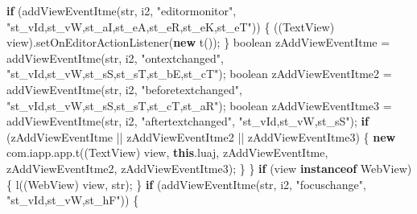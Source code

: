 \documentclass[
]{article}
\newenvironment{Shaded}{}{}
\newcommand{\ControlFlowTok}[1]{\textcolor[rgb]{0.00,0.44,0.13}{\textbf{#1}}}
\newcommand{\DataTypeTok}[1]{\textcolor[rgb]{0.56,0.13,0.00}{#1}}
\newcommand{\FunctionTok}[1]{\textcolor[rgb]{0.02,0.16,0.49}{#1}}
\newcommand{\KeywordTok}[1]{\textcolor[rgb]{0.00,0.44,0.13}{\textbf{#1}}}
\newcommand{\NormalTok}[1]{#1}
\newcommand{\OperatorTok}[1]{\textcolor[rgb]{0.40,0.40,0.40}{#1}}
\newcommand{\StringTok}[1]{\textcolor[rgb]{0.25,0.44,0.63}{#1}}
\begin{document}
\begin{Shaded}
\begin{Highlighting}[]
            \ControlFlowTok{if} \OperatorTok{(}\FunctionTok{addViewEventItme}\OperatorTok{(}\NormalTok{str}\OperatorTok{,}\NormalTok{ i2}\OperatorTok{,} \StringTok{"editormonitor"}\OperatorTok{,} \StringTok{"st\_vId,st\_vW,st\_aI,st\_eA,st\_eR,st\_eK,st\_eT"}\OperatorTok{))} \OperatorTok{\{}
                \OperatorTok{((}\NormalTok{TextView}\OperatorTok{)}\NormalTok{ view}\OperatorTok{).}\FunctionTok{setOnEditorActionListener}\OperatorTok{(}\KeywordTok{new} \FunctionTok{t}\OperatorTok{());}
            \OperatorTok{\}}
            \DataTypeTok{boolean}\NormalTok{ zAddViewEventItme }\OperatorTok{=} \FunctionTok{addViewEventItme}\OperatorTok{(}\NormalTok{str}\OperatorTok{,}\NormalTok{ i2}\OperatorTok{,} \StringTok{"ontextchanged"}\OperatorTok{,} \StringTok{"st\_vId,st\_vW,st\_sS,st\_sT,st\_bE,st\_cT"}\OperatorTok{);}
            \DataTypeTok{boolean}\NormalTok{ zAddViewEventItme2 }\OperatorTok{=} \FunctionTok{addViewEventItme}\OperatorTok{(}\NormalTok{str}\OperatorTok{,}\NormalTok{ i2}\OperatorTok{,} \StringTok{"beforetextchanged"}\OperatorTok{,} \StringTok{"st\_vId,st\_vW,st\_sS,st\_sT,st\_cT,st\_aR"}\OperatorTok{);}
            \DataTypeTok{boolean}\NormalTok{ zAddViewEventItme3 }\OperatorTok{=} \FunctionTok{addViewEventItme}\OperatorTok{(}\NormalTok{str}\OperatorTok{,}\NormalTok{ i2}\OperatorTok{,} \StringTok{"aftertextchanged"}\OperatorTok{,} \StringTok{"st\_vId,st\_vW,st\_sS"}\OperatorTok{);}
            \ControlFlowTok{if} \OperatorTok{(}\NormalTok{zAddViewEventItme }\OperatorTok{||}\NormalTok{ zAddViewEventItme2 }\OperatorTok{||}\NormalTok{ zAddViewEventItme3}\OperatorTok{)} \OperatorTok{\{}
                \KeywordTok{new}\NormalTok{ com}\OperatorTok{.}\FunctionTok{iapp}\OperatorTok{.}\FunctionTok{app}\OperatorTok{.}\FunctionTok{t}\OperatorTok{((}\NormalTok{TextView}\OperatorTok{)}\NormalTok{ view}\OperatorTok{,} \KeywordTok{this}\OperatorTok{.}\FunctionTok{luaj}\OperatorTok{,}\NormalTok{ zAddViewEventItme}\OperatorTok{,}\NormalTok{ zAddViewEventItme2}\OperatorTok{,}\NormalTok{ zAddViewEventItme3}\OperatorTok{);}
            \OperatorTok{\}}
        \OperatorTok{\}}
        \ControlFlowTok{if} \OperatorTok{(}\NormalTok{view }\KeywordTok{instanceof}\NormalTok{ WebView}\OperatorTok{)} \OperatorTok{\{}
            \FunctionTok{l}\OperatorTok{((}\NormalTok{WebView}\OperatorTok{)}\NormalTok{ view}\OperatorTok{,}\NormalTok{ str}\OperatorTok{);}
        \OperatorTok{\}}
        \ControlFlowTok{if} \OperatorTok{(}\FunctionTok{addViewEventItme}\OperatorTok{(}\NormalTok{str}\OperatorTok{,}\NormalTok{ i2}\OperatorTok{,} \StringTok{"focuschange"}\OperatorTok{,} \StringTok{"st\_vId,st\_vW,st\_hF"}\OperatorTok{))} \OperatorTok{\{}

\end{Highlighting}
\end{Shaded}
\end{document}
